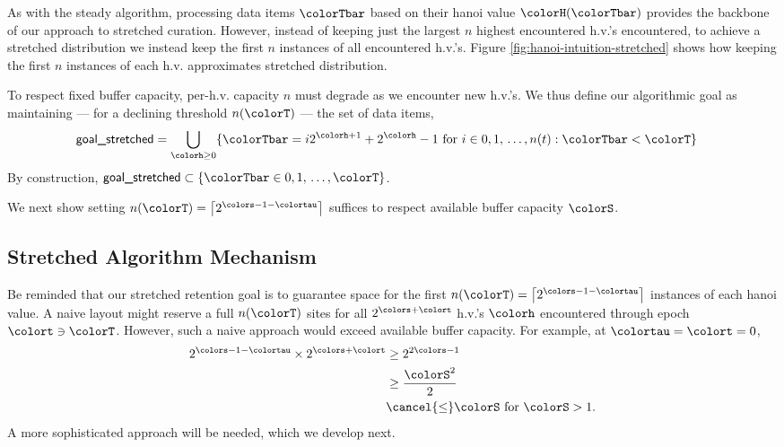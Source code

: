 

As with the steady algorithm, processing data items $\colorTbar$ based on their hanoi value $\colorH(\colorTbar)$ provides the backbone of our approach to stretched curation.
However, instead of keeping just the largest $n$ highest encountered h.v.'s encountered, to achieve a stretched distribution we instead keep the first $n$ instances of all encountered h.v.'s.
Figure \ref{fig:hanoi-intuition-stretched} shows how keeping the first $n$ instances of each h.v. approximates stretched distribution.

To respect fixed buffer capacity, per-h.v. capacity $n$ must degrade as we encounter new h.v.'s.
We thus define our algorithmic goal as maintaining --- for a declining threshold $n(\colorT)$ --- the set of data items,
\begin{align*}
\textsf{goal\_stretched}
&=
\bigcup_{\colorh \geq 0}
\{ \colorTbar = i2^{\colorh + 1} + 2^{\colorh} - 1 \text{ for } i \in 0,1,\,\ldots,n(t) : \colorTbar < \colorT \}
\end{align*}
By construction, $\textsf{goal\_stretched} \subset \{ \colorTbar \in 0, 1, \, \ldots, \colorT \}$.

We next show setting $n(\colorT) = \left\lceil 2^{\colors - 1 - \colortau} \right\rceil$ suffices to respect available buffer capacity $\colorS$.





\subsection{Stretched Algorithm Mechanism}
\label{sec:stretched-mechanism}



Be reminded that our stretched retention goal is to guarantee space for the first $n(\colorT) =  \left\lceil2^{\colors - 1 - \colortau}\right\rceil$ instances of each hanoi value.
A naive layout might reserve a full $n(\colorT)$ sites for all $2^{\colors + \colort}$ h.v.'s $\colorh$ encountered through epoch $\colort \ni \colorT$.
However, such a naive approach would exceed available buffer capacity.
For example, at $\colortau=\colort=0$,
\begin{align*}
2^{\colors - 1 - \colortau} \times 2^{\colors + \colort}
&\geq
2^{2\colors - 1}\\
&\geq
\frac{\colorS^{2}}{2}\\
&\cancel{\leq} \colorS \text{ for } \colorS > 1.
\end{align*}
A more sophisticated approach will be needed, which we develop next.

